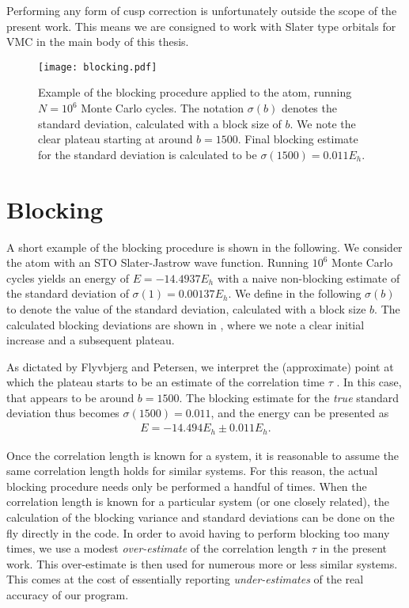\documentclass[../../master.tex]{subfiles}
\begin{document}
Performing any form of cusp correction is unfortunately outside the scope of the present work. This means we are consigned to work with Slater type orbitals for VMC in the main body of this thesis.





\begin{SCfigure}
\centering
\texttt{[image: blocking.pdf]}
\caption{Example of the blocking procedure applied to the  atom, running $N=10^6$ Monte Carlo cycles. The notation $\sigma(b)$ denotes the standard deviation, calculated with a block size of $b$. We note the clear plateau starting at around $b=1500$. Final blocking estimate for the standard deviation is calculated to be $\sigma(1500)=0.011 E_h$. \label{fig:blocking}}
\end{SCfigure}

\section{Blocking}
A short example of the blocking procedure is shown in the following. We consider the  atom with an STO Slater-Jastrow wave function. Running $10^6$ Monte Carlo cycles yields an energy of $E=-14.4937 E_h$ with a naive non-blocking estimate of the standard deviation of $\sigma(1)=0.00137 E_h$. We define in the following $\sigma(b)$ to denote the value of the standard deviation, calculated with a block size $b$. The calculated blocking deviations are shown in , where we note a clear initial increase and a subsequent plateau. 

As dictated by Flyvbjerg and Petersen, we interpret the (approximate) point at which the plateau starts to be an estimate of the correlation time $\tau$ \cite{blocking}. In this case, that appears to be around $b=1500$. The blocking estimate for the \emph{true} standard deviation thus becomes $\sigma(1500)=0.011$, and the energy can be presented as 
\begin{align}
E=-14.494E_h \pm 0.011 E_h.
\end{align} 

Once the correlation length is known for a system, it is reasonable to assume the same correlation length holds for similar systems. For this reason, the actual blocking procedure needs only be performed a handful of times. When the correlation length is known for a particular system (or one closely related), the calculation of the blocking variance and standard deviations can be done on the fly directly in the \CC{}{ }code. In order to avoid having to perform blocking too many times, we use a modest \emph{over-estimate} of the correlation length $\tau$ in the present work. This over-estimate is then used for numerous more or less similar systems. This comes at the cost of essentially reporting \emph{under-estimates} of the real accuracy of our program.
\end{document}

